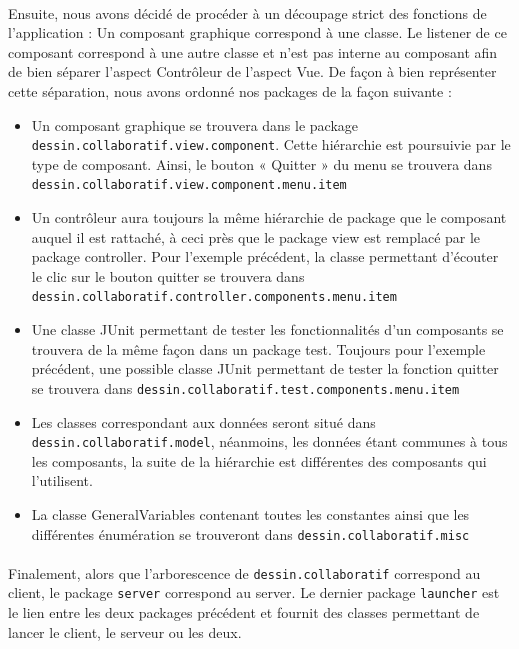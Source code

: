 \documentclass[a4paper,11pt]{article}
\begin{document}
\paragraph{} Ensuite, nous avons décidé de procéder à un découpage strict des fonctions de l'application : Un composant graphique correspond à une classe. Le listener de ce composant correspond à une autre classe et n'est pas interne au composant afin de bien séparer l'aspect Contrôleur de l'aspect Vue. De façon à bien représenter cette séparation, nous avons ordonné nos packages de la façon suivante : 

\begin{itemize}
	\item Un composant graphique se trouvera dans le package \texttt{dessin.collaboratif.view.component}. Cette hiérarchie est poursuivie par le type de composant. Ainsi, le bouton « Quitter » du menu se trouvera dans \texttt{dessin.collaboratif.view.component.menu.item}
	\item Un contrôleur aura toujours la même hiérarchie de package que le composant auquel il est rattaché, à ceci près que le package view est remplacé par le package controller. Pour l'exemple précédent, la classe permettant d'écouter le clic sur le bouton quitter se trouvera dans \texttt{dessin.collaboratif.controller.components.menu.item}
	\item Une classe JUnit permettant de tester les fonctionnalités d'un composants se trouvera de la même façon dans un package test. Toujours pour l'exemple précédent, une possible classe JUnit permettant de tester la fonction quitter se trouvera dans \texttt{dessin.collaboratif.test.components.menu.item}
	\item Les classes correspondant aux données seront situé dans \texttt{dessin.collaboratif.model}, néanmoins, les données étant communes à tous les composants, la suite de la hiérarchie est différentes des composants qui l'utilisent.
	\item La classe GeneralVariables contenant toutes les constantes ainsi que les différentes énumération se trouveront dans \texttt{dessin.collaboratif.misc}
\end{itemize}

\paragraph{} Finalement, alors que l’arborescence de \texttt{dessin.collaboratif} correspond au client, le package \texttt{server} correspond au server. Le dernier package \texttt{launcher} est le lien entre les deux packages précédent et fournit des classes permettant de lancer le client, le serveur ou les deux.
\end{document}
